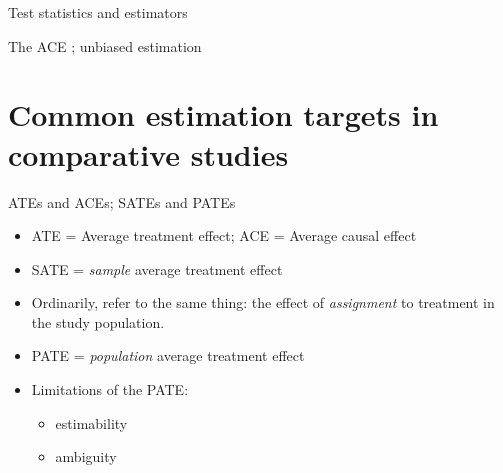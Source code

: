 \begin{frame}{Test statistics and estimators}
  
\end{frame}


\begin{frame}{The ACE ; unbiased estimation}
  
\end{frame}

\section{Common estimation targets in comparative studies}


\begin{frame}{ATEs and ACEs; SATEs and PATEs}

  \begin{itemize}
  \item ATE = Average treatment effect; ACE = Average causal effect

  \item SATE = \textit{sample} average treatment effect
  \item Ordinarily, refer to the same thing: the effect of \textit{assignment} to treatment in the study population.
  \item PATE = \textit{population} average treatment effect
  \item Limitations of the PATE:
    \begin{itemize}
    \item estimability
    \item ambiguity
    \end{itemize}

  \end{itemize}

\end{frame}


